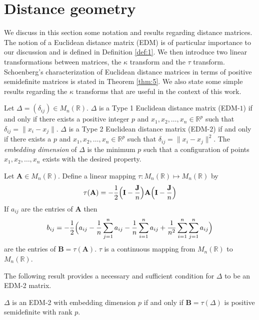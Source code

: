 \section{Distance geometry}
\label{sec:distance-geometry}
We discuss in this section some notation and results regarding
distance matrices. The notion of a Euclidean distance matrix (EDM) is
of particular importance to our discussion and is defined in
Definition \ref{def:1}. We then introduce two linear transformations
between matrices, the $\kappa$ transform and the $\tau$ transform.
Schoenberg's characterization
\citep{schoenberg35:_remar_mauric_frech_artic_sur} of Euclidean
distance matrices in terms of positive semidefinite matrices is
stated in Theorem \ref{thm:5}. We also state some simple results
regarding the $\kappa$ transforms that are useful in the context of
this work.

\begin{definition}
  \label{def:10}
  Let $\Delta = (\delta_{ij}) \in M_n(\mathbb{R})$. $\Delta$ is a Type 1
  Euclidean distance matrix (EDM-$1$) if and only if there exists a
  positive integer $p$ and $x_1, x_2, \dots, x_n \in \mathbb{R}^{p}$
  such that $\delta_{ij} = \| x_i - x_j \|$. $\Delta$ is a Type 2
  Euclidean distance matrix (EDM-$2$) if and only if there exists a
  $p$ and $x_1, x_2, \dots, x_n \in \mathbb{R}^{p}$ such that
  $\delta_{ij} = \|x_i - x_j\|^{2}$. The {\em embedding dimension} of
  $\Delta$ is the minimum $p$ such that a configuration of points
  $x_1, x_2, \dots, x_n$ exists with the desired property.
\end{definition}

\begin{definition}
  \label{def:11}
  Let $\mathbf{A} \in M_n(\mathbb{R})$. Define a linear mapping $\tau \colon M_n(\mathbb{R})
  \mapsto M_n(\mathbb{R})$ by
  \begin{equation}
    \label{eq:83}
    \tau(\mathbf{A}) = - \frac{1}{2} \Bigl(\mathbf{I} -
    \frac{\mathbf{J}}{n}\Bigr)\mathbf{A} \Bigl(\mathbf{I} - \frac{\mathbf{J}}{n}\Bigr)
  \end{equation}
  If $a_{ij}$ are the entries of $\mathbf{A}$ then
  \begin{equation}
    \label{eq:56}
    b_{ij} = -\frac{1}{2}\Bigl(a_{ij} - \frac{1}{n}\sum_{j=1}^{n}a_{ij} -
    \frac{1}{n}\sum_{i=1}^{n}{a_{ij}} +
      \frac{1}{n^2}\sum_{i=1}^{n}\sum_{j=1}^{n}a_{ij}\Bigr)
  \end{equation}
  are the entries of $\mathbf{B} = \tau(\mathbf{A})$. $\tau$
  is a continuous mapping from $M_n(\mathbb{R})$ to
  $M_n(\mathbb{R})$. 
\end{definition}
%
The following result provides a necessary and sufficient condition for
$\Delta$ to be an EDM-2 matrix.
\begin{theorem}
  \label{thm:5}
  $\Delta$ is an EDM-2 with embedding dimension $p$ if and only
  if $\mathbf{B} = \tau(\Delta)$ is positive semidefinite with rank
  $p$. 
\end{theorem}

